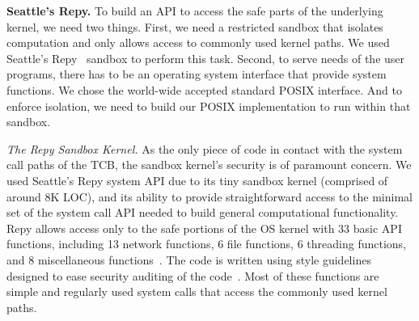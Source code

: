 %

\textbf{Seattle's Repy.}
To build an API to access the safe parts of the underlying kernel, we need
two things. First, we need a restricted sandbox that isolates computation
and only allows access to commonly used kernel paths.  We used
Seattle's Repy~\cite{Repy-10} sandbox to perform this task.
Second, to serve needs of the user programs, there has to be an operating system interface that 
provide system functions. We chose the world-wide accepted standard POSIX interface. 
And to enforce isolation, we need to build our POSIX implementation to run within that sandbox.

\textit{The Repy Sandbox Kernel.}
As the only piece of code in contact with the system call paths of the TCB,
the sandbox kernel's security is of paramount concern.
We used Seattle's Repy system API due to its tiny sandbox kernel
(comprised of around 8K LOC), and its ability to provide straightforward
access to the minimal set of the system call API needed to build general
computational functionality. Repy allows
access only to the safe portions of the OS kernel with 33 basic API
functions, including 13 network functions, 6 file functions, 6 threading functions,
and 8 miscellaneous functions~\cite{Repy-10, RepyKernel}. The code is
written using style guidelines designed to ease security auditing
 of the code~\cite{style}. Most of these functions are simple and
regularly used system calls that access the commonly used kernel paths.


